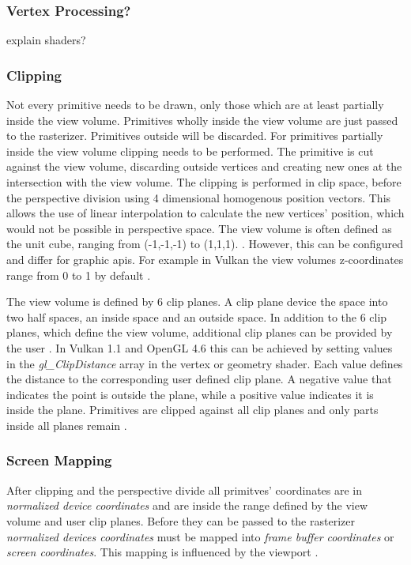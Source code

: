 \subsubsection{Vertex Processing?}
explain shaders?

\subsubsection{Clipping }
\label{section:clipping}

Not every primitive needs to be drawn, only those which are at least partially inside the view volume. Primitives wholly inside the view volume are just passed to the rasterizer. Primitives outside will be discarded. For primitives partially inside the view volume clipping needs to be performed. The primitive is cut against the view volume, discarding outside vertices and creating new ones at the intersection with the view volume. The clipping is performed in clip space, before the perspective division using  4 dimensional homogenous position vectors. This allows the use of linear interpolation to calculate the new vertices' position, which would not be possible in perspective space. The view volume is often defined as the unit cube, ranging from (-1,-1,-1) to (1,1,1).
\cite{akine:2018:realtime}. However, this can be configured and differ for graphic \glspl{api}. For example in Vulkan the view volumes z-coordinates range from 0 to 1 by default \cite{khronos:glsl4.60:spec}.

The view volume is defined by 6 clip planes. A clip plane device the space into two half spaces, an inside space and an outside space.
In addition to the 6 clip planes, which define the view volume, additional clip planes can be provided by the user \cite{akine:2018:realtime}. In Vulkan 1.1 and OpenGL 4.6 this can be achieved by setting values in the \textit{gl\_ClipDistance} array in the vertex or geometry shader. Each value defines the distance to the corresponding user defined clip plane. A negative value that indicates the point is outside the plane, while a positive value indicates it is inside the plane.  Primitives are clipped against all clip planes and only parts inside all planes remain \cite{khronos:vulkan:spec1.1, khronos:openGL:spec4.6}.

\subsubsection{Screen Mapping}
After clipping and the perspective divide all primitves' coordinates are in \textit{normalized device coordinates} and are inside the range defined by the view volume and user clip planes. Before they can be passed to the rasterizer \textit{normalized devices coordinates} must be mapped into \textit{frame buffer coordinates} or \textit{screen coordinates}. This mapping is influenced by the viewport \cite{akine:2018:realtime, khronos:vulkan:spec1.1}.

